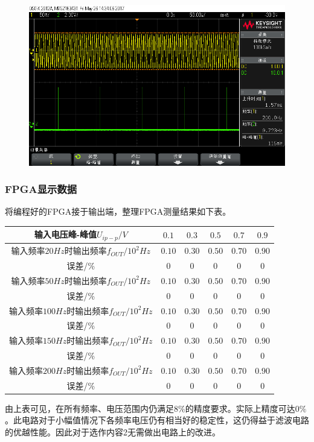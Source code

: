 \documentclass[12pt,a4paper]{article}
\begin{document}
\begin{spacing}{1.3}
\begin{figure}[H]
\includegraphics[width=\textwidth]{scope_4.png}
\end{figure}
\subsubsection{FPGA显示数据}
将编程好的FPGA接于输出端，整理FPGA测量结果如下表。
\begin{table}[H]
\centering
\begin{tabular}{|c|c|c|c|c|c|}
\hline 
输入电压峰-峰值$U_{ip-p}/V$&$0.1$&$0.3$&$0.5$&$0.7$&$0.9$\\ \hline 
输入频率$20Hz时输出频率f_{OUT}/10^2Hz$&$0.10$ &$0.30$ &$0.50$ &$0.70$ &$0.90$ \\ \hline
误差/\%&$0$&$0$&$0$&$0$&$0$\\ \hline
输入频率$50Hz时输出频率f_{OUT}/10^2Hz$&$0.10$ &$0.30$ &$0.50$ &$0.70$ &$0.90$ \\ \hline
误差/\%&$0$&$0$&$0$&$0$&$0$\\ \hline
输入频率$100Hz时输出频率f_{OUT}/10^2Hz$&$0.10$ &$0.30$ &$0.50$ &$0.70$ &$0.90$ \\ \hline
误差/\%&$0$&$0$&$0$&$0$&$0$\\ \hline
输入频率$150Hz时输出频率f_{OUT}/10^2Hz$&$0.10$ &$0.30$ &$0.50$ &$0.70$ &$0.90$ \\ \hline
误差/\%&$0$&$0$&$0$&$0$&$0$\\ \hline
输入频率$200Hz时输出频率f_{OUT}/10^2Hz$&$0.10$ &$0.30$ &$0.50$ &$0.70$ &$0.90$ \\ \hline
误差/\%&$0$&$0$&$0$&$0$&$0$\\ \hline
\end{tabular} 
\end{table}
由上表可见，在所有频率、电压范围内仍满足$8\%$的精度要求。实际上精度可达$0\%$。此电路对于小幅值情况下各频率电压仍有相当好的稳定性，这仍得益于滤波电路的优越性能。因此对于选作内容2无需做出电路上的改进。

\end{spacing}
\end{document}
